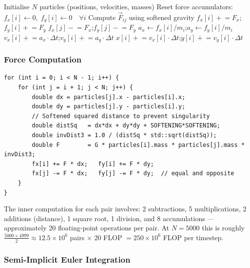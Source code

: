 ﻿\documentclass[12pt,a4paper]{article}
\begin{document}
\begin{algorithm}[H]
\caption{Sequential N-Body Simulation}
\begin{algorithmic}[1]
\State Initialise $N$ particles (positions, velocities, masses)
    \State Reset force accumulators: $f_x[i] \leftarrow 0,\; f_y[i] \leftarrow 0 \quad \forall i$
            \State Compute $\vec{F}_{ij}$ using softened gravity
            \State $f_x[i] \mathrel{+}= F_x$;\quad $f_y[i] \mathrel{+}= F_y$
            \State $f_x[j] \mathrel{-}= F_x$;\quad $f_y[j] \mathrel{-}= F_y$ 
        \EndFor
    \EndFor
        \State $a_x \leftarrow f_x[i] / m_i$;\quad $a_y \leftarrow f_y[i] / m_i$
        \State $v_x[i] \mathrel{+}= a_x \cdot \Delta t$;\quad $v_y[i] \mathrel{+}= a_y \cdot \Delta t$
        \State $x[i] \mathrel{+}= v_x[i] \cdot \Delta t$;\quad $y[i] \mathrel{+}= v_y[i] \cdot \Delta t$
    \EndFor
\EndFor
\end{algorithmic}
\end{algorithm}

\subsubsection*{Force Computation}

\begin{lstlisting}
for (int i = 0; i < N - 1; i++) {
    for (int j = i + 1; j < N; j++) {
        double dx = particles[j].x - particles[i].x;
        double dy = particles[j].y - particles[i].y;
        // Softened squared distance to prevent singularity
        double distSq   = dx*dx + dy*dy + SOFTENING*SOFTENING;
        double invDist3 = 1.0 / (distSq * std::sqrt(distSq));
        double F        = G * particles[i].mass * particles[j].mass * invDist3;
        fx[i] += F * dx;   fy[i] += F * dy;
        fx[j] -= F * dx;   fy[j] -= F * dy;  // equal and opposite
    }
}
\end{lstlisting}

The inner computation for each pair involves: 2 subtractions, 5 multiplications,
2 additions (distance), 1 square root, 1 division, and 8 accumulations ---
approximately 20 floating-point operations per pair. At $N=5000$ this is
roughly $\frac{5000 \times 4999}{2} \approx 12.5 \times 10^6$ pairs
$\times$ 20 FLOP $= 250 \times 10^6$ FLOP per timestep.

\subsubsection*{Semi-Implicit Euler Integration}
\end{document}
